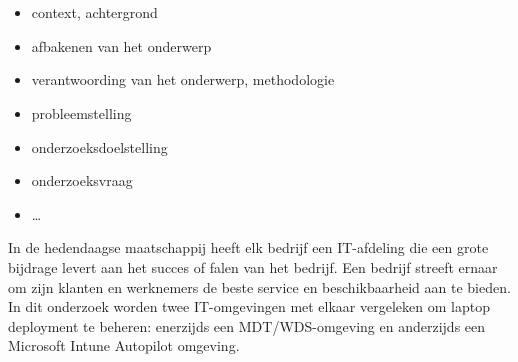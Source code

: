 
\chapter{}
\label{ch:inleiding}


\begin{itemize}
  \item context, achtergrond
  \item afbakenen van het onderwerp
  \item verantwoording van het onderwerp, methodologie
  \item probleemstelling
  \item onderzoeksdoelstelling
  \item onderzoeksvraag
  \item \ldots
\end{itemize}

In de hedendaagse maatschappij heeft elk bedrijf een IT-afdeling die een grote bijdrage levert aan het succes of falen van het bedrijf. Een bedrijf streeft ernaar om zijn klanten en werknemers de beste service en beschikbaarheid aan te bieden. In dit onderzoek worden twee IT-omgevingen met elkaar vergeleken om laptop deployment te beheren: enerzijds een MDT/WDS-omgeving en anderzijds een Microsoft Intune Autopilot omgeving.

\section{}
\label{sec:probleemstelling}

